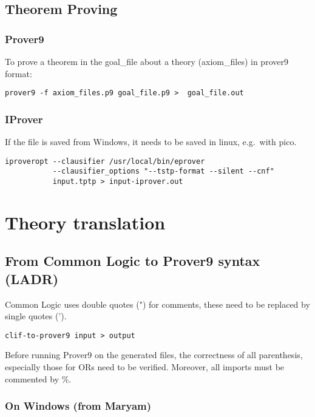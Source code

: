 \documentclass{article}
\begin{document}
\subsection{Theorem Proving}

\subsubsection{Prover9}

To prove a theorem in the goal\_file about a theory (axiom\_files) in prover9 format:

\begin{verbatim}
prover9 -f axiom_files.p9 goal_file.p9 >  goal_file.out
\end{verbatim}

\subsubsection{IProver}

If the file is saved from Windows, it needs to be saved in linux, e.g.\ with pico.

\begin{verbatim}
iproveropt --clausifier /usr/local/bin/eprover 
           --clausifier_options "--tstp-format --silent --cnf"
           input.tptp > input-iprover.out
\end{verbatim}

\section{Theory translation}

\subsection{From Common Logic to Prover9 syntax (LADR)}

Common Logic uses double quotes (") for comments, these need to be replaced by single quotes (').

\begin{verbatim}
clif-to-prover9 input > output
\end{verbatim}

Before running Prover9 on the generated files, the correctness of all parenthesis, especially those for ORs need to be verified.
Moreover, all imports must be commented by \%.

\subsubsection{On Windows (from Maryam)}
\end{document}

